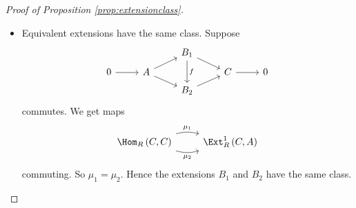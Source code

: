 \begin{proof}[Proof of Proposition \ref{prop:extensionclass}]
\begin{itemize}
\item Equivalent extensions have the same class. Suppose
$$
\begin{tikzcd}[row sep=tiny]
& & B_1 \arrow{dr} \arrow{dd}{f} & & \\
0 \arrow{r} & A \arrow{ur} \arrow[swap]{dr} & & C \arrow{r} & 0 \\
& & B_2 \arrow[swap]{ur} & &
\end{tikzcd}
$$
commutes. We get maps
$$
\begin{tikzcd}[row sep=tiny]
\Hom_R\br{C, C} \arrow[bend left=15]{r}{\mu_1} \arrow[bend right=15, swap]{r}{\mu_2} & \Ext_R^1\br{C, A}
\end{tikzcd}
$$
commuting. So $ \mu_1 = \mu_2 $. Hence the extensions $ B_1 $ and $ B_2 $ have the same class.
\end{itemize}

\pagebreak


\end{proof}
